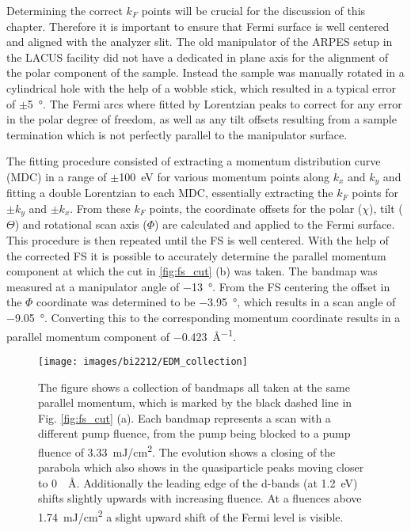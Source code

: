 Determining the correct $k_F$ points will be crucial for the discussion of this chapter.
Therefore it is important to ensure that Fermi surface is well centered and aligned with the analyzer slit.
The old manipulator of the ARPES setup in the LACUS facility did not have a dedicated in plane axis for the alignment of the polar component of the sample.
Instead the sample was manually rotated in a cylindrical hole with the help of a wobble stick, which resulted in a typical error of $\pm$\qty{5}{\degree}.
The Fermi arcs where fitted by Lorentzian peaks to correct for any error in the polar degree of freedom, as well as any tilt offsets resulting from a sample termination which is not perfectly parallel to the manipulator surface.

The fitting procedure consisted of extracting a momentum distribution curve (MDC) in a range of $\pm$\qty{100}{\electronvolt} for various momentum points along $k_x$ and $k_y$ and fitting a double Lorentzian to each MDC, essentially extracting the $k_F$ points for $\pm k_y$ and $\pm k_x$.
From these $k_F$ points, the coordinate offsets for the polar ($\chi$), tilt ($\Theta$) and rotational scan axis ($\Phi$) are calculated and applied to the Fermi surface.
This procedure is then repeated until the FS  is well centered.
With the help of the corrected FS it is possible to accurately determine the parallel momentum component at which the cut in \ref{fig:fs_cut} (b) was taken.
The bandmap was measured at a manipulator angle of \qty{-13}{\degree}.
From the FS centering the offset in the $\Phi$ coordinate was determined to be \qty{-3.95}{\degree}, which results in a scan angle of \qty{-9.05}{\degree}.
Converting this to the corresponding momentum coordinate results in a parallel momentum component of \qty{-0.423}{\angstrom^{-1}}.

\begin{figure}[th!]
	\centering
	\texttt{[image: images/bi2212/EDM\_collection]}
	\caption{The figure shows a collection of bandmaps all taken at the same parallel momentum, which is marked by the black dashed line in Fig. \ref{fig:fs_cut} (a). Each bandmap represents a scan with a different pump fluence, from the pump being blocked to a pump fluence of \qty{3.33}{\milli\joule/\centi\meter\squared}. The evolution shows a closing of the parabola which also shows in the quasiparticle peaks moving closer to \qty{0}{\per\angstrom}. Additionally the leading edge of the  d-bands (at \qty{1.2}{\electronvolt}) shifts slightly upwards with increasing fluence. At a fluences above \qty{1.74}{\milli\joule/\centi\meter\squared} a slight upward shift of the Fermi level is visible.}
	\label{fig:edm_collection}
\end{figure}

